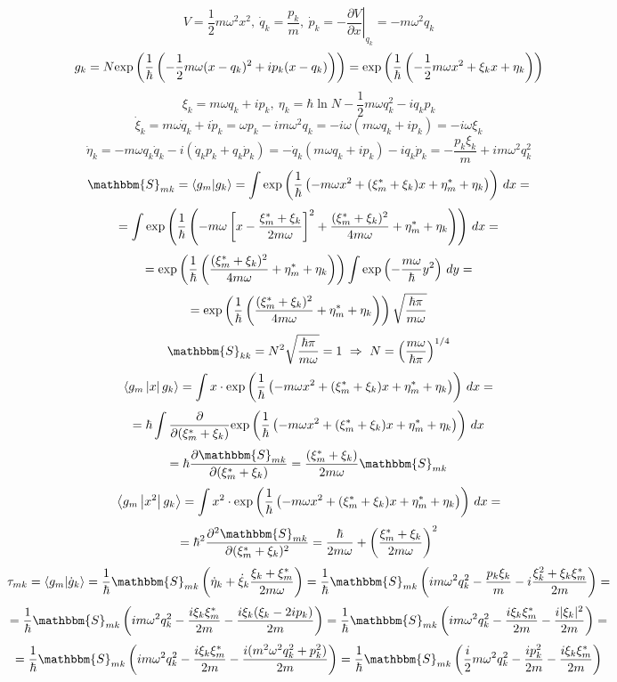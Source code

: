 $$V = \frac{1}{2}m\omega^2x^2,\ \dot{q}_k=\frac{p_k}{m},\ \dot{p}_k=-\left.\frac{\partial V}{\partial x}\right|_{q_k}=-m\omega^2q_k $$
$$g_k = N\text{exp}\left( \frac{1}{\hbar}\left(-\frac{1}{2}m\omega(x-q_k)^2+ip_k(x-q_k)\right) \right) = \text{exp}\left( \frac{1}{\hbar}\left(-\frac{1}{2}m\omega x^2 + \xi_kx + \eta_k\right) \right)$$
$$\xi_k = m\omega q_k + ip_k,\ \eta_k = \hbar\ln{N} - \frac{1}{2}m\omega q_k^2 - iq_kp_k$$
$$\dot{\xi}_k=m\omega\dot{q}_k+i\dot{p}_k=\omega p_k - im\omega^2q_k = -i\omega(m\omega q_k + ip_k)=-i\omega\xi_k$$
$$\dot{\eta}_k=-m\omega q_k\dot{q}_k-i(\dot{q}_kp_k+q_k\dot{p}_k)=-\dot{q}_k(m\omega q_k + ip_k)-iq_k\dot{p}_k=-\frac{p_k\xi_k}{m}+im\omega^2 q_k^2$$
$$\mathbbm{S}_{mk}=\myint{g_m}{g_k}=\int\myexp{\frac{1}{\hbar}\left(-m\omega x^2+(\xi_m^*+\xi_k)x+\eta_m^*+\eta_k\right)}\,dx=$$
$$=\int\myexp{\frac{1}{\hbar}\left(-m\omega\left[x-\frac{\xi_m^*+\xi_k}{2m\omega}\right]^2+\frac{(\xi_m^*+\xi_k)^2}{4m\omega}+%
				   \eta_m^*+\eta_k\right)}\,dx=$$
$$=\text{exp}\left( \frac{1}{\hbar}\left(\frac{(\xi_m^*+\xi_k)^2}{4m\omega}+\eta_m^*+\eta_k\right) \right)\int\text{exp}\left( -\frac{m\omega}{\hbar}y^2 \right)\,dy=$$
$$=\text{exp}\left( \frac{1}{\hbar}\left(\frac{(\xi_m^*+\xi_k)^2}{4m\omega}+\eta_m^*+\eta_k\right) \right)\sqrt{\frac{\hbar\pi}{m\omega}}$$
$$\mathbbm{S}_{kk}= N^2 \sqrt{ \frac{\hbar\pi}{m\omega} }=1\ \Rightarrow\ N = \left(\frac{m\omega}{\hbar\pi}\right)^{1/4}$$
$$\left\langle g_m \left| x \right| g_k \right\rangle = \int x\cdot\text{exp}\left( \frac{1}{\hbar}\left(-m\omega x^2+(\xi_m^*+\xi_k)x+\eta_m^*+\eta_k\right) \right)\,dx=$$
$$=\hbar\int\frac{\partial}{\partial(\xi_m^*+\xi_k)}\text{exp}\left( \frac{1}{\hbar}\left(-m\omega x^2 + (\xi_m^*+\xi_k)x+\eta_m^*+\eta_k\right) \right)\,dx$$
$$=\hbar\frac{\partial\mathbbm{S}_{mk}}{\partial(\xi_m^*+\xi_k)}=\frac{(\xi_m^*+\xi_k)}{2m\omega}\mathbbm{S}_{mk}$$
$$\left\langle g_m \left| x^2 \right| g_k \right\rangle=\int x^2\cdot\text{exp}\left( \frac{1}{\hbar}\left(-m\omega x^2+(\xi_m^*+\xi_k)x+\eta_m^*+\eta_k\right) \right)\,dx=$$
$$=\hbar^2\frac{\partial^2\mathbbm{S}_{mk}}{\partial(\xi_m^*+\xi_k)^2}=\frac{\hbar}{2m\omega}+\left(\frac{\xi_m^*+\xi_k}{2m\omega}\right)^2$$
$$\tau_{mk}=\myint{g_m}{\dot{g}_k}=\frac{1}{\hbar}\mathbbm{S}_{mk}\left( \dot{\eta}_k+\dot{\xi}_k\frac{\xi_k+\xi_m^*}{2m\omega}\right)=%
				   \frac{1}{\hbar}\mathbbm{S}_{mk}\left(im\omega^2 q_k^2-\frac{p_k\xi_k}{m}-i\frac{\xi_k^2+\xi_k\xi_m^*}{2m}\right)=$$
$$=\frac{1}{\hbar}\mathbbm{S}_{mk}\left(im\omega^2 q_k^2 - \frac{i\xi_k\xi_m^*}{2m} - \frac{i\xi_k(\xi_k-2ip_k)}{2m}\right)=%
   \frac{1}{\hbar}\mathbbm{S}_{mk}\left(im\omega^2 q_k^2 - \frac{i\xi_k\xi_m^*}{2m} - \frac{i|\xi_k|^2}{2m} \right)=$$
$$=\frac{1}{\hbar}\mathbbm{S}_{mk}\left(im\omega^2 q_k^2 - \frac{i\xi_k\xi_m^*}{2m} - \frac{i(m^2\omega^2q_k^2 + p_k^2)}{2m} \right)=%
   \frac{1}{\hbar}\mathbbm{S}_{mk}\left(\frac{i}{2}m\omega^2q_k^2 - \frac{ip_k^2}{2m} - \frac{i\xi_k\xi_m^*}{2m}\right)$$
